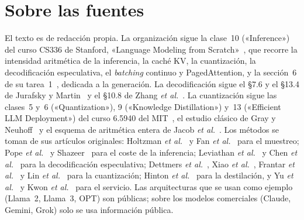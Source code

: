 \documentclass[11pt,a4paper,twoside,openany]{book}
\begin{document}
\section*{Sobre las fuentes}
El texto es de redacción propia. La organización sigue la clase~10 («Inference») del curso CS336 de Stanford, «Language Modeling from Scratch»~\cite{cs336}, que recorre la intensidad aritmética de la inferencia, la caché KV, la cuantización, la decodificación especulativa, el \emph{batching} continuo y PagedAttention, y la sección~6 de su tarea~1~\cite{cs336a1}, dedicada a la generación. La decodificación sigue el §7.6 y el §13.4 de Jurafsky y Martin~\cite{jm3} y el §10.8 de Zhang \emph{et al.}~\cite{d2l}. La cuantización sigue las clases~5 y~6 («Quantization»), 9 («Knowledge Distillation») y~13 («Efficient LLM Deployment») del curso 6.5940 del MIT~\cite{mit65940}, el estudio clásico de Gray y Neuhoff~\cite{grayneuhoff} y el esquema de aritmética entera de Jacob \emph{et al.}~\cite{jacob}. Los métodos se toman de sus artículos originales: Holtzman \emph{et al.}~\cite{holtzman} y Fan \emph{et al.}~\cite{fan} para el muestreo; Pope \emph{et al.}~\cite{pope} y Shazeer~\cite{shazeer} para el coste de la inferencia; Leviathan \emph{et al.}~\cite{leviathan} y Chen \emph{et al.}~\cite{chen} para la decodificación especulativa; Dettmers \emph{et al.}~\cite{llmint8,qlora}, Xiao \emph{et al.}~\cite{smoothquant}, Frantar \emph{et al.}~\cite{gptq} y Lin \emph{et al.}~\cite{awq} para la cuantización; Hinton \emph{et al.}~\cite{hinton} para la destilación, y Yu \emph{et al.}~\cite{orca} y Kwon \emph{et al.}~\cite{kwon} para el servicio. Las arquitecturas que se usan como ejemplo (Llama~2, Llama~3, OPT) son públicas; sobre los modelos comerciales (Claude, Gemini, Grok) solo se usa información pública.
\end{document}
